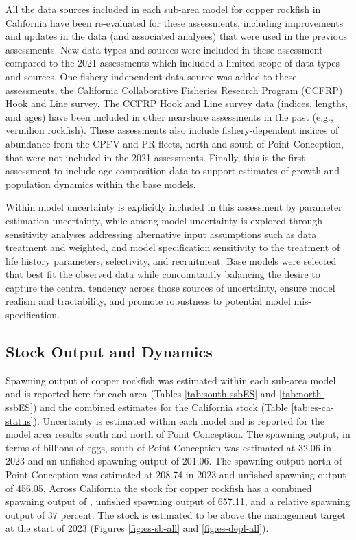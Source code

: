 \documentclass[11pt,
  letterpaper,
]{article}
\begin{document}
All the data sources included in each sub-area model for copper rockfish in California have been re-evaluated for these assessments, including improvements and updates in the data (and associated analyses) that were used in the previous assessments. New data types and sources were included in these assessment compared to the 2021 assessments which included a limited scope of data types and sources. One fishery-independent data source was added to these assessments, the California Collaborative Fisheries Research Program (CCFRP) Hook and Line survey. The CCFRP Hook and Line survey data (indices, lengths, and ages) have been included in other nearshore assessments in the past (e.g., vermilion rockfish). These assessments also include fishery-dependent indices of abundance from the CPFV and PR fleets, north and south of Point Conception, that were not included in the 2021 assessments. Finally, this is the first assessment to include age composition data to support estimates of growth and population dynamics within the base models.

Within model uncertainty is explicitly included in this assessment by parameter estimation uncertainty, while among model uncertainty is explored through sensitivity analyses addressing alternative input assumptions such as data treatment and weighted, and model specification sensitivity to the treatment of life history parameters, selectivity, and recruitment. Base models were selected that best fit the observed data while concomitantly balancing the desire to capture the central tendency across those sources of uncertainty, ensure model realism and tractability, and promote robustness to potential model mis-specification.

\subsection*{Stock Output and Dynamics}\label{stock-output-and-dynamics}

Spawning output of copper rockfish was estimated within each sub-area model and is reported here for each area (Tables \ref{tab:south-ssbES} and \ref{tab:north-ssbES}) and the combined estimates for the California stock (Table \ref{tab:es-ca-status}). Uncertainty is estimated within each model and is reported for the model area results south and north of Point Conception. The spawning output, in terms of billions of eggs, south of Point Conception was estimated at 32.06 in 2023 and an unfished spawning output of 201.06. The spawning output north of Point Conception was estimated at 208.74 in 2023 and unfished spawning output of 456.05. Across California the stock for copper rockfish has a combined spawning output of , unfished spawning output of 657.11, and a relative spawning output of 37 percent. The stock is estimated to be above the management target at the start of 2023 (Figures \ref{fig:es-sb-all} and \ref{fig:es-depl-all}).
\end{document}

